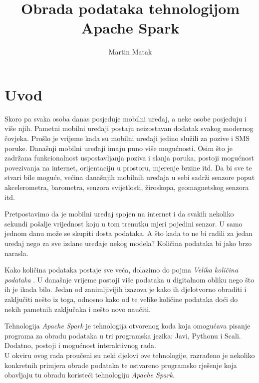 \documentclass[times, utf8, zavrsni, numeric]{fer}
\begin{document}

\title{Obrada podataka tehnologijom Apache Spark}

\author{Martin Matak}

\maketitle




\tableofcontents

\chapter{Uvod}
Skoro pa svaka osoba danas posjeduje mobilni uređaj, a neke osobe posjeduju i više njih. Pametni mobilni uređaji postaju neizostavan dodatak svakog modernog čovjeka. Prošlo je vrijeme kada su mobilni uređaji jedino služili za pozive i SMS poruke. Današnji mobilni uređaji imaju puno više mogućnosti. Osim što je zadržana funkcionalnost uspostavljanja poziva i slanja poruka, postoji mogućnost povezivanja na internet, orijentaciju u prostoru, mjerenje brzine itd. Da bi sve te stvari bile moguće, većina današnjih mobilnih uređaja u sebi sadrži senzore poput akcelerometra, barometra, senzora svijetlosti, žiroskopa, geomagnetskog senzora itd.

Pretpostavimo da je mobilni uređaj spojen na internet i da svakih nekoliko sekundi pošalje vrijednost koju u tom trenutku mjeri pojedini senzor. U samo jednom danu može se skupiti dosta podataka. A što kada to ne bi radili za jedan uređaj nego za sve izdane uređaje nekog modela? Količina podataka bi jako brzo narasla.

Kako količina podataka postaje sve veća, dolazimo do pojma \emph{Velika količina podataka} . U današnje vrijeme postoji više podataka u digitalnom obliku nego što ih je ikada bilo. Jedan od zanimljivijih izazova je kako ih djelotvorno obraditi i zaključiti nešto iz toga, odnosno kako od te velike količine podataka doći do nekih pametnih zaključaka i nešto novo naučiti.

Tehnologija \emph{Apache Spark} je tehnologija otvorenog koda  koja omogućava pisanje programa za obradu podataka u tri programska jezika: Javi, Pythonu i Scali. Dodatno, postoji i mogućnost interaktivnog rada. \\
U okviru ovog rada proučeni su neki djelovi ove tehnologije, razrađeno je nekoliko konkretnih primjera obrade podataka te ostvareno programsko rješenje koja obavljaju tu obradu koristeći tehnologiju \emph{Apache Spark}.
\end{document}
